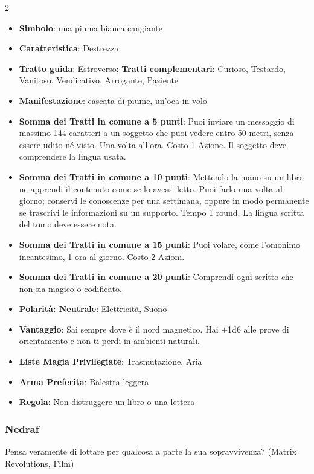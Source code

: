 \begin{multicols}{2}
\begin{itemize}[leftmargin=*] \setlength{\itemsep}{0pt}
\item \textbf{Simbolo}: una piuma bianca cangiante
\item \textbf{Caratteristica}: Destrezza
\item \textbf{Tratto guida}: Estroverso; \textbf{Tratti complementari}: Curioso, Testardo, Vanitoso, Vendicativo, Arrogante, Paziente
\item \textbf{Manifestazione}: cascata di piume, un'oca in volo
\item \textbf{Somma dei Tratti in comune a 5 punti}: Puoi inviare un messaggio di massimo 144 caratteri a un soggetto che puoi vedere entro 50 metri, senza essere udito né visto. Una volta all'ora. Costo 1 Azione. Il soggetto deve comprendere la lingua usata.
\item \textbf{Somma dei Tratti in comune a 10 punti}: Mettendo la mano su un libro ne apprendi il contenuto come se lo avessi letto. Puoi farlo una volta al giorno; conservi le conoscenze per una settimana, oppure in modo permanente se trascrivi le informazioni su un supporto. Tempo 1 round. La lingua scritta del tomo deve essere nota.
\item \textbf{Somma dei Tratti in comune a 15 punti}: Puoi volare, come l'omonimo incantesimo, 1 ora al giorno. Costo 2 Azioni.
\item \textbf{Somma dei Tratti in comune a 20 punti}: Comprendi ogni scritto che non sia magico o codificato.
\item \textbf{Polarità: Neutrale}: Elettricità, Suono
\item \textbf{Vantaggio}: Sai sempre dove è il nord magnetico. Hai +1d6 alle prove di orientamento e non ti perdi in ambienti naturali.
\item \textbf{Liste Magia Privilegiate}: Trasmutazione, Aria
\item \textbf{Arma Preferita}: Balestra leggera
\item \textbf{Regola}: Non distruggere un libro o una lettera
\end{itemize}

\subsubsection{Nedraf}\label{nedraf}\hypertarget{nedraf}{}

\begin{enfasi}{
Pensa veramente di lottare per qualcosa a parte la sua sopravvivenza? (Matrix Revolutions, Film)

}
\end{enfasi}
\end{multicols}

